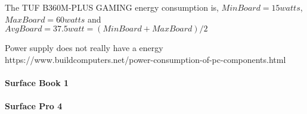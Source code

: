 The TUF B360M-PLUS GAMING energy consumption is, $MinBoard = 15 watts$, $MaxBoard = 60 watts$ and $AvgBoard = 37.5 watt= (MinBoard+MaxBoard)/2$

Power supply does not really have a energy 
https://www.buildcomputers.net/power-consumption-of-pc-components.html

\paragraph{Surface Book 1}

\paragraph{Surface Pro 4}